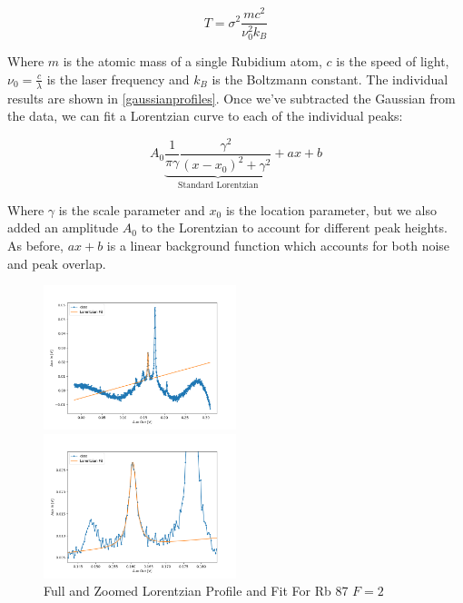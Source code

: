 \documentclass[12pt, a4paper]{article}
\begin{document}
\begin{equation}
T = \sigma^2 \frac{mc^2}{\nu_0^2 k_B}
\label{temperature}
\end{equation}

Where $m$ is the atomic mass of a single Rubidium atom, $c$ is the speed of light, $\nu_0 = \frac{c}{\lambda}$ is the laser frequency and $k_B$ is the Boltzmann constant. The individual results are shown in \autoref{gaussianprofiles}. Once we've subtracted the Gaussian from the data, we can fit a Lorentzian curve to each of the individual peaks:

\begin{equation}
A_0 \underbrace{\frac{1}{\pi\gamma}\frac{\gamma^2}{(x-x_0)^2 + \gamma^2}}_\text{Standard Lorentzian} + ax + b
\end{equation}

Where $\gamma$ is the scale parameter and $x_0$ is the location parameter, but we also added an amplitude $A_0$ to the Lorentzian to account for different peak heights. As before, $ax + b$ is a linear background function which accounts for both noise and peak overlap.

\begin{figure}
    \centering
    \parbox{0.45\textwidth}{
        \includegraphics[width=0.5\textwidth]{lorentzianfull.png}
    }
    \hfill
    \parbox{0.45\textwidth}{
        \includegraphics[width=0.5\textwidth]{examplelorentzian.png}
    }
    \caption{Full and Zoomed Lorentzian Profile and Fit For Rb 87 $F = 2$}
    \label{lorentzianprofile}
\end{figure}
\end{document}
